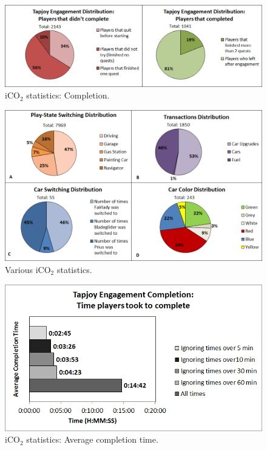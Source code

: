 \documentclass[preprint,authoryear,12pt]{elsarticle}
\begin{document}
\begin{figure}[htb]
	\begin{center}
		\includegraphics[width=.95\linewidth]{ijhcs14-img/completion}
		\caption{iCO$_2$ statistics: Completion.\label{fig:completion}}
	\end{center}
\end{figure}


\begin{figure}[htb]
	\begin{center}
		\includegraphics[width=.95\linewidth]{ijhcs14-img/4diagrams2}
		\caption{Various iCO$_2$ statistics.\label{fig:4diagrams}}
	\end{center}
\end{figure}

\begin{figure}[htb]
	\begin{center}
		\includegraphics[width=.8\linewidth]{ijhcs14-img/time}
		\caption{iCO$_2$ statistics: Average completion time.\label{fig:time}}
	\end{center}
\end{figure}
\end{document}
